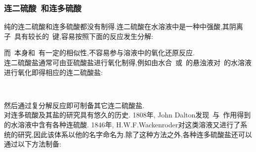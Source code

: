 \documentclass{ctexbook}
\begin{document}
\subsubsection{连二硫酸~和连多硫酸~}
纯的连二硫酸和连多硫酸都没有制得.连二硫酸在水溶液中是一种中强酸,其阴离子~具有较长的~键,容易按照下面的反应发生分解:
\begin{tightcenter}
\end{tightcenter}
而~本身和~有一定的相似性,不容易参与溶液中的氧化还原反应.\\
\indent 连二硫酸盐通常可由亚硫酸盐进行氧化制得,例如由水合~或~的悬浊液对~的水溶液进行氧化即得相应的连二硫酸盐:
\begin{tightcenter}
    \\
\end{tightcenter}
然后通过复分解反应即可制备其它连二硫酸盐.\\
\indent 对连多硫酸及其盐的研究具有悠久的历史. 1808年, John Dalton发现~与~作用得到的水溶液中含有各种连硫酸. 1846年, H.W.F.Wackenroder对这类溶液又进行了系统的研究,因此该体系以他的名字命名为.除了这种方法之外,各种连多硫酸盐还可以通过以下方法制备:
\begin{tightcenter}
    \\
    \\
    \\
\end{tightcenter}
\end{document}
